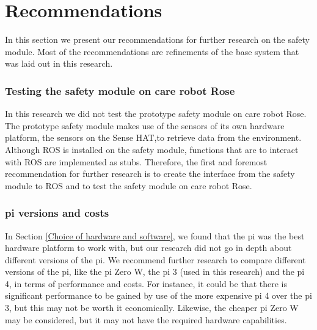 \documentclass[12pt]{scrreprt}
\begin{document}
\newpage
\chapter{Recommendations}
\label{Recommendation}
    
In this section we present our recommendations for further research on the safety module. Most of the recommendations are refinements of the base system that was laid out in this research.

\subsection{Testing the safety module on care robot Rose}
In this research we did not test the prototype safety module on care robot Rose. The prototype safety module makes use of the sensors of its own hardware platform, the sensors on the Sense HAT,to retrieve data from the environment. Although ROS is installed on the safety module, functions that are to interact with ROS are implemented as stubs. Therefore, the first and foremost recommendation for further research is to create the interface from the safety module to ROS and to test the safety module on care robot Rose.

\subsection{\gls{pi} versions and costs}
\label{pi versions and costs}
In Section \ref{Choice of hardware and software}, we found that the \gls{pi} was the best hardware platform to work with, but our research did not go in depth about different versions of the \gls{pi}. We recommend further research to compare different versions of the \gls{pi}, like the \gls{pi} Zero W, the \gls{pi} 3 (used in this research) and the \gls{pi} 4, in terms of performance and costs. For instance, it could be that there is significant performance to be gained by use of the more expensive \gls{pi} 4 over the \gls{pi} 3, but this may not be worth it economically. Likewise, the cheaper \gls{pi} Zero W may be considered, but it may not have the required hardware capabilities.
\end{document}
